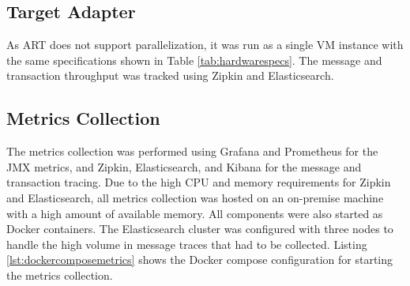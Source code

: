 \subsection{Target Adapter}
As \ac{ART} does not support parallelization, it was run as a single \ac{VM} instance with the same specifications shown in Table \ref{tab:hardwarespecs}. The message and transaction throughput was tracked using Zipkin and Elasticsearch.

\subsection{Metrics Collection}
The metrics collection was performed using Grafana and Prometheus for the \ac{JMX} metrics, and Zipkin, Elasticsearch, and Kibana for the message and transaction tracing. Due to the high \ac{CPU} and memory requirements for Zipkin and Elasticsearch, all metrics collection was hosted on an on-premise machine with a high amount of available memory. All components were also started as Docker containers. The Elasticsearch cluster was configured with three nodes to handle the high volume in message traces that had to be collected. Listing \ref{lst:dockercomposemetrics} shows the Docker compose configuration for starting the metrics collection.